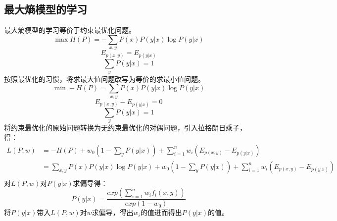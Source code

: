 \documentclass{article}
\begin{document}
	\subsection{最大熵模型的学习}
	最大熵模型的学习等价于约束最优化问题。
	\begin{equation*}
	\max H\left ( P \right )=-\sum _{x,y}P\left ( x \right )P\left ( y|x \right )\log P\left ( y|x \right )
	\end{equation*}
	\begin{equation*}
		E_{p\left ( x,y \right )}=E_{p\left ( y|x \right )}
	\end{equation*}
	\begin{equation*}
	\sum_{y}P\left ( y|x \right )=1
	\end{equation*}
	按照最优化的习惯，将求最大值问题改写为等价的求最小值问题。
	\begin{equation*}
	\min -H\left ( P \right )=\sum _{x,y}P\left ( x \right )P\left ( y|x \right )\log P\left ( y|x \right )
	\end{equation*}
	\begin{equation*}
	E_{p\left ( x,y \right )}-E_{p\left ( y|x \right )}=0
	\end{equation*}
	\begin{equation*}
	\sum_{y}P\left ( y|x \right )=1
	\end{equation*}
	将约束最优化的原始问题转换为无约束最优化的对偶问题，引入拉格朗日乘子，得：
	\begin{align*}
	L\left ( P,w \right )&=-H\left ( P \right )+w_{0}\left ( 1-\sum _{y}P\left ( y|x \right ) \right )+\sum_{i=1}^{n}w_{i}\left ( E_{p\left ( x,y \right )}-E_{p\left ( y|x \right )} \right )\\
	&=\sum _{x,y}P\left ( x \right )P\left ( y|x \right )\log P\left ( y|x \right )+w_{0}\left ( 1-\sum _{y}P\left ( y|x \right ) \right )+\sum_{i=1}^{n}w_{i}\left ( E_{p\left ( x,y \right )}-E_{p\left ( y|x \right )} \right )\\
	\end{align*}
	对$L(P,w)$对$P(y|x)$求偏导得：
	\begin{equation}
	P\left ( y|x \right )=\frac{exp\left ( \sum_{i=1}^{n}w_{i}f_{i}\left ( x,y \right ) \right )}{exp\left ( 1-w_{0} \right )}
	\end{equation}
	将$P(y|x)$带入$L(P,w)$对$w$求偏导，得出$w_{i}$的值进而得出$P(y|x)$的值。
	
\end{document}

